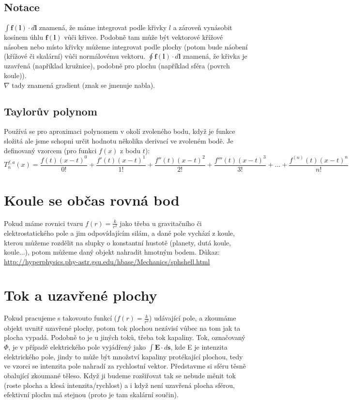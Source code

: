 \documentclass[titlepage]{book}
\begin{document}
\subsection{Notace}
$\int \boldsymbol f(\boldsymbol l) \cdot d\boldsymbol l$ znamená, že máme integrovat podle křivky $l$ a zároveň vynásobit kosínem úhlu $\boldsymbol f(\boldsymbol l)$ vůči křivce. Podobně tam může být vektorové křížové násoben nebo místo křivky můžeme integrovat podle plochy (potom bude náobení (křížové či skalární) vůči normálovému vektoru. $\oint \boldsymbol f(\boldsymbol l) \cdot d\boldsymbol l$ znamená, že křivka je uzavřená (například kružnice), podobně pro plochu (například sféra (povrch koule)).\\
$\nabla$ tady znamená gradient (znak se jmenuje nabla).
\subsection{Taylorův polynom}
Používá se pro aproximaci polynomem v okolí zvoleného bodu, když je funkce složitá ale jsme schopni určit hodnotu několika derivací ve zvoleném bodě. Je definovaný vzorcem (pro funkci $f(x)$ z bodu $t$):
\begin{equation}
T_n^{f,a}(x) = \frac{f(t)(x-t)^0}{0!} + \frac{f'(t)(x-t)^1}{1!} + \frac{f''(t)(x-t)^2}{2!} + \frac{f'''(t)(x-t)^3}{3!} + ... + \frac{f^{(n)}(t)(x-t)^n}{n!}
\end{equation}
\section{Koule se občas rovná bod}
Pokud máme rovnici tvaru $f(r) = \frac{k}{r^2}$ jako třeba u gravitačního či elektrostatického pole a jim odpovídajícím silám, a dané pole vychází z koule, kterou můžeme rozdělit na slupky o konstantní hustotě (planety, dutá koule, koule...), potom můžeme daný objekt nahradit hmotným bodem. Důkaz: \url{http://hyperphysics.phy-astr.gsu.edu/hbase/Mechanics/sphshell.html}\\
\section{Tok a uzavřené plochy}\label{sec:tok}
Pokud pracujeme s takovouto funkcí ($f(r) = \frac{k}{r^2}$) udávající pole, a zkoumáme objekt uvnitř uzavřené plochy, potom tok plochou nezávisí vůbec na tom jak ta plocha vypadá. Podobně to je u jiných toků, třeba tok kapaliny. Tok, označovaný $\Phi$, je v případě elektrického pole vyjádřený jako $\int \boldsymbol E \cdot d\boldsymbol s$, kde E je intenzita elektrického pole, jindy to může být množství kapaliny protékající plochou, tedy ve vzorci se intenzita pole nahradí za rychlostní vektor. Představme si sféru těsně obalující zkoumané těleso. Když ji budeme rozšiřovat tak se nebude měnit tok (roste plocha a klesá  intenzita/rychlost) a i když není uzavřená plocha sférou, efektivní plochu má stejnou (proto je tam skalární součin).
\end{document}
